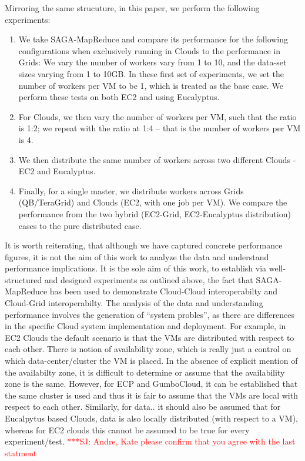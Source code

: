 \documentclass[conference,final]{IEEEtran}
\newcommand{\jhanote}[1]{ {\textcolor{red} { ***SJ: #1 }}}
\newcommand{\jhanote}[1]{}
\newcommand{\sagamapreduce }{SAGA-MapReduce }
\begin{document}
Mirroring the same strucuture, in this paper, we perform the following
experiments:
\begin{enumerate}
\item We take \sagamapreduce and compare its performance for the
  following configurations when exclusively running in Clouds to the
  performance in Grids: We vary the number of workers vary from 1 to
  10, and the data-set sizes varying from 1 to 10GB.  In these first
  set of experiments, we set the number of workers per VM to be 1,
  which is treated as the base case.  We perform these tests on both
  EC2 and using Eucalyptus.
\item For Clouds, we then vary the number of workers per VM, such that
  the ratio is 1:2; we repeat with the ratio at 1:4 -- that is the
  number of workers per VM is 4.
\item We then distribute the same number of workers across two
  different Clouds - EC2 and Eucalyptus.
\item Finally, for a single master, we distribute workers across Grids
  (QB/TeraGrid) and Clouds (EC2, with one job per VM). We
  compare the performance from the two hybrid (EC2-Grid,
  EC2-Eucalyptus distribution) cases to the pure distributed case.
\end{enumerate}

It is worth reiterating, that although we have captured concrete
performance figures, it is not the aim of this work to analyze the
data and understand performance implications. It is the sole aim of
this work, to establish via well-structured and designed experiments
as outlined above, the fact that \sagamapreduce has been used to
demonstrate Cloud-Cloud interoperabilty and Cloud-Grid
interoperabilty.  The analysis of the data and understanding
performance involves the generation of ``system probles'', as there
are differences in the specific Cloud system implementation and
deployment. For example, in EC2 Clouds the default scenario is that
the VMs are distributed with respect to each other. There is notion of
availability zone, which is really just a control on which
data-center/cluster the VM is placed. In the absence of explicit
mention of the availabilty zone, it is difficult to determine or
assume that the availability zone is the same. However, for ECP and
GumboCloud, it can be established that the same cluster is used and
thus it is fair to assume that the VMs are local with respect to each
other.  Similarly, for data.. it should also be assumed that for
Eucalpytus based Clouds, data is also locally distributed (with
respect to a VM), whereas for EC2 clouds this cannot be assumed to be
true for every experiment/test. \jhanote{Andre, Kate please confirm
  that you agree with the last statment}
\end{document}
